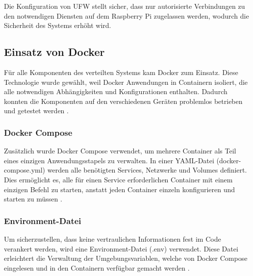 Die Konfiguration von UFW stellt sicher, dass nur autorisierte Verbindungen zu den notwendigen Diensten auf dem Raspberry Pi zugelassen werden, wodurch die Sicherheit des Systems erhöht wird.


\subsection{Einsatz von Docker}

Für alle Komponenten des verteilten Systems kam Docker zum Einsatz. Diese Technologie wurde gewählt, weil Docker Anwendungen in Containern isoliert, die alle notwendigen Abhängigkeiten und Konfigurationen enthalten. Dadurch konnten die Komponenten auf  den verschiedenen Geräten problemlos betrieben und getestet werden \cite{Aerisdocker}.

\subsubsection{Docker Compose}

Zusätzlich wurde Docker Compose verwendet, um mehrere Container als Teil eines einzigen Anwendungsstapels zu verwalten. In einer YAML-Datei (docker-compose.yml) werden alle benötigten Services, Netzwerke und Volumes definiert. Dies ermöglicht es, alle für einen Service erforderlichen Container mit einem einzigen Befehl zu starten, anstatt jeden Container einzeln konfigurieren und starten zu müssen \cite{DockerCompose}.

\subsubsection{Environment-Datei}

Um sicherzustellen, dass keine vertraulichen Informationen fest im Code verankert werden, wird eine Environment-Datei (.env) verwendet. Diese Datei erleichtert die Verwaltung der Umgebungsvariablen, welche von Docker Compose eingelesen und in den Containern verfügbar gemacht werden \cite{DockerEnv}.
